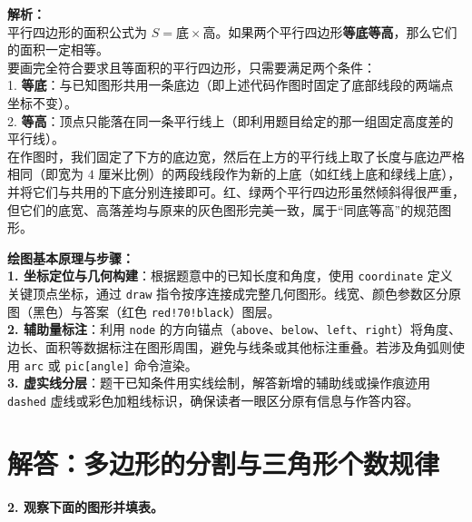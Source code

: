 \vspace{0.6cm}
{\small\color{gray}
\textbf{解析：}\\
平行四边形的面积公式为 $S = \text{底} \times \text{高}$。如果两个平行四边形\textbf{等底等高}，那么它们的面积一定相等。\\
要画完全符合要求且等面积的平行四边形，只需要满足两个条件：\\
1. \textbf{等底}：与已知图形共用一条底边（即上述代码作图时固定了底部线段的两端点坐标不变）。\\
2. \textbf{等高}：顶点只能落在同一条平行线上（即利用题目给定的那一组固定高度差的平行线）。\\
在作图时，我们固定了下方的底边宽，然后在上方的平行线上取了长度与底边严格相同（即宽为 $4$ 厘米比例）的两段线段作为新的上底（如红线上底和绿线上底），并将它们与共用的下底分别连接即可。红、绿两个平行四边形虽然倾斜得很严重，但它们的底宽、高落差均与原来的灰色图形完美一致，属于“同底等高”的规范图形。
}


\vspace{0.6cm}

{\small\color{blue!70!black}
\textbf{绘图基本原理与步骤：}\\
\textbf{1. 坐标定位与几何构建}：根据题意中的已知长度和角度，使用 \texttt{coordinate} 定义关键顶点坐标，通过 \texttt{draw} 指令按序连接成完整几何图形。线宽、颜色参数区分原图（黑色）与答案（红色 \texttt{red!70!black}）图层。\\
\textbf{2. 辅助量标注}：利用 \texttt{node} 的方向锚点（\texttt{above}、\texttt{below}、\texttt{left}、\texttt{right}）将角度、边长、面积等数据标注在图形周围，避免与线条或其他标注重叠。若涉及角弧则使用 \texttt{arc} 或 \texttt{pic[angle]} 命令渲染。\\
\textbf{3. 虚实线分层}：题干已知条件用实线绘制，解答新增的辅助线或操作痕迹用 \texttt{dashed} 虚线或彩色加粗线标识，确保读者一眼区分原有信息与作答内容。
}

\newpage





\newpage

\section{解答：多边形的分割与三角形个数规律}

\vspace{0.4cm}

\noindent\textbf{2. 观察下面的图形并填表。}

